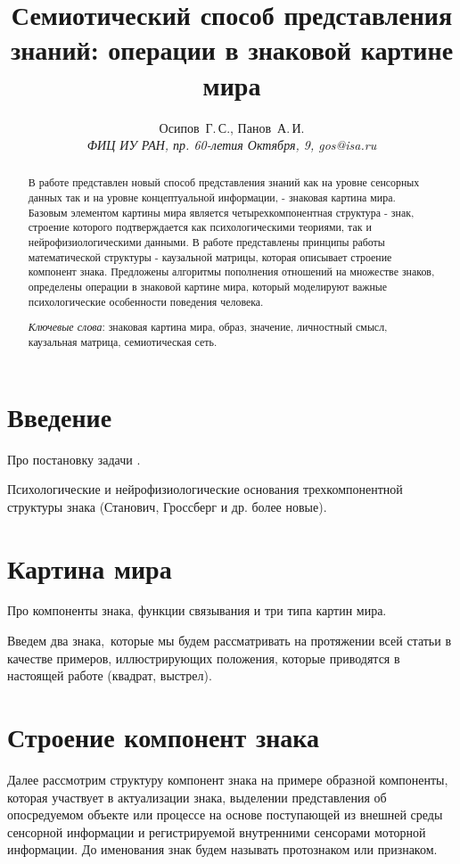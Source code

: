 \documentclass[12pt]{scrartcl}
\title{Семиотический способ представления знаний: операции в знаковой картине мира}
\author{Осипов~Г.\,С., Панов~А.\,И.\\
	{\large\slshape ФИЦ ИУ РАН, пр. 60-летия Октября, 9, gos@isa.ru}}
\begin{document}
	
	\maketitle{}
	\begin{abstract}
		В работе представлен новый способ представления знаний как на уровне сенсорных данных так и на уровне концептуальной информации, - знаковая картина мира. Базовым элементом картины мира является четырехкомпонентная структура - знак, строение которого подтверждается как психологическими теориями, так и нейрофизиологическими данными. В работе представлены принципы работы математической структуры - каузальной матрицы, которая описывает строение компонент знака. Предложены алгоритмы пополнения отношений на множестве знаков, определены операции в знаковой картине мира, который моделируют важные психологические особенности поведения человека.
		\par\bigskip
		\textit{Ключевые слова}: знаковая картина мира, образ, значение, личностный смысл, каузальная матрица, семиотическая сеть.
	\end{abstract}
	
	
	
	\section*{Введение}
	Про постановку задачи \cite{Osipov2014c,Osipov2015d}.
	
	Психологические и нейрофизиологические основания трехкомпонентной структуры знака (Станович, Гроссберг и др. более новые).
	
	\section{Картина мира}

	Про компоненты знака, функции связывания и три типа картин мира.
	
	Введем два знака,~которые мы будем рассматривать на протяжении всей статьи в качестве примеров, иллюстрирующих положения, которые приводятся в настоящей работе (квадрат, выстрел).
	
	
	\section{Строение компонент знака}
	
	Далее рассмотрим структуру компонент знака на примере образной компоненты, которая участвует в актуализации знака, выделении представления об опосредуемом объекте или процессе на основе поступающей из внешней среды сенсорной информации и регистрируемой внутренними сенсорами моторной информации. До именования знак будем называть протознаком или признаком.
	
\end{document}
